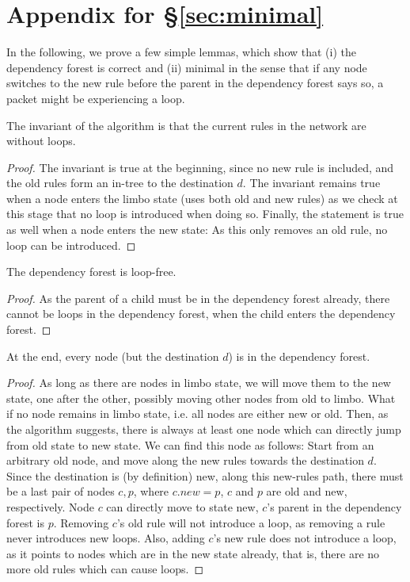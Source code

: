 \section{Appendix for \S\ref{sec:minimal}}

In the following, we prove a few simple lemmas, which show that (i) the dependency forest is correct and (ii) minimal in the sense that if any node switches to the new rule before the parent in the dependency forest says so, a packet might be experiencing a loop.

\begin{lemma}\label{lemma:invariant} The invariant of the algorithm is that the current rules in the network are without loops.
\end{lemma}

\begin{proof} The invariant is true at the beginning, since no new rule is included, and the old rules form an in-tree to the destination $d$. The invariant remains true when a node enters the limbo state (uses both old and new rules) as we check at this stage that no loop is introduced when doing so. Finally, the statement is true as well when a node enters the new state: As this only removes an old rule, no loop can be introduced.
\end{proof}

\begin{lemma}\label{lemma:loop-free} The dependency forest is loop-free.
\end{lemma}

\begin{proof} As the parent of a child must be in the dependency forest already, there cannot be loops in the dependency forest, when the child enters the dependency forest.
\end{proof}

\begin{lemma}\label{lemma:forest} At the end, every node (but the destination $d$) is in the dependency forest.
\end{lemma}

\begin{proof} As long as there are nodes in limbo state, we will move them to the new state, one after the other, possibly moving other nodes from old to limbo. What if no node remains in limbo state, i.e. all nodes are either new or old. Then, as the algorithm suggests, there is always at least one node which can directly jump from old state to new state. We can find this node as follows: Start from an arbitrary old node, and move along the new rules towards the destination $d$. Since the destination is (by definition) new, along this new-rules path, there must be a last pair of nodes $c,p$, where $c.new = p$, $c$ and $p$ are old and new, respectively. Node $c$ can directly move to state new, $c$'s parent in the dependency forest is $p$. Removing $c$'s old rule will not introduce a loop, as removing a rule never introduces new loops. Also, adding $c$'s new rule does not introduce a loop, as it points to nodes which are in the new state already, that is, there are no more old rules which can cause loops.
\end{proof}

